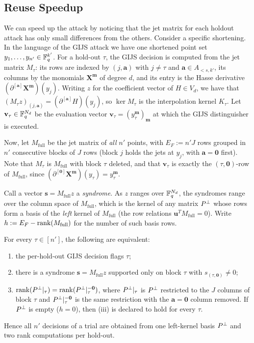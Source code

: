 \subsection{Reuse Speedup}\label{sec:reuse-attack}
We can speed up the attack by noticing that the jet matrix for 
each holdout attack has only small differences from the others. Consider a specific shortening. In the language of the GIJS attack 
we have one shortened point set
$y_1,\dots,y_{n'} \in \mathbb{F}_q^{k'}$. For a hold-out $\tau$, the GIJS
decision is computed from the jet matrix $M_\tau$: its rows are
indexed by $(j,\mathbf{a})$ with $j\neq \tau$ and
$\mathbf{a}\in A_{<s,k'}$, its columns by the monomials
$\mathbf{X}^{\mathbf{m}}$ of degree $d$, and its entry is the Hasse
derivative $(\partial^{[\mathbf{a}]}\mathbf{X}^{\mathbf{m}})(y_j)$.
Writing $z$ for the coefficient vector of $H\in V_d$, we have that $(M_\tau
z)_{(j,\mathbf{a})} = (\partial^{[\mathbf{a}]}H)(y_j)$, so
$\ker M_\tau$ is the interpolation kernel $K_\tau$. Let $\mathbf{v}_\tau
\in \mathbb{F}_q^{N_d}$ be the evaluation vector
$\mathbf{v}_\tau = (y_\tau^{\mathbf{m}})_{\mathbf{m}}$ at which the GIJS 
distinguisher is executed.

Now, let $M_{\mathrm{full}}$ be the jet matrix of \emph{all} $n'$ points,
with $E_F := n'J$ rows grouped in $n'$ consecutive blocks of $J$ rows
(block $j$ holds the jets at $y_j$, with $\mathbf{a}=\mathbf{0}$
first). Note that $M_\tau$ is $M_{\mathrm{full}}$ with block $\tau$
deleted, and that $\mathbf{v}_\tau$ is exactly the
$(\tau,\mathbf{0})$-row of $M_{\mathrm{full}}$, since
$(\partial^{[\mathbf{0}]}\mathbf{X}^{\mathbf{m}})(y_\tau) =
y_\tau^{\mathbf{m}}$.

Call a vector $\mathbf{s} = M_{\mathrm{full}} z$ a \emph{syndrome}. As
$z$ ranges over $\mathbb{F}_q^{N_d}$, the syndromes range over the column
space of $M_{\mathrm{full}}$, which is the kernel of any matrix
$P^{\perp}$ whose rows form a basis of the \emph{left} kernel of
$M_{\mathrm{full}}$ (the row relations $\mathbf{u}^{T} M_{\mathrm{full}} =
0$). Write $h := E_F - \operatorname{rank}(M_{\mathrm{full}})$ for the number of such
basis rows.

\begin{theorem}\label{thm:reuse-exact}
For every $\tau\in[n']$, the following are equivalent:
\begin{enumerate}
\item[(i)] the per-hold-out GIJS decision flags $\tau$;
\item[(ii)] there is a syndrome $\mathbf{s} = M_{\mathrm{full}} z$
supported only on block $\tau$ with $s_{(\tau,\mathbf{0})} \neq 0$;
\item[(iii)] $\operatorname{rank}(P^{\perp}|_\tau) = \operatorname{rank}(P^{\perp}|_\tau^{-\mathbf{0}})$,
where $P^{\perp}|_\tau$ is $P^{\perp}$ restricted to the $J$ columns of
block $\tau$ and $P^{\perp}|_\tau^{-\mathbf{0}}$ is the same restriction
with the $\mathbf{a}=\mathbf{0}$ column removed. If $P^{\perp}$ is empty
($h=0$), then \textup{(iii)} is declared to hold for every $\tau$.
\end{enumerate}
Hence all $n'$ decisions of a trial are obtained from one left-kernel
basis $P^{\perp}$ and two rank computations per hold-out.
\end{theorem}

